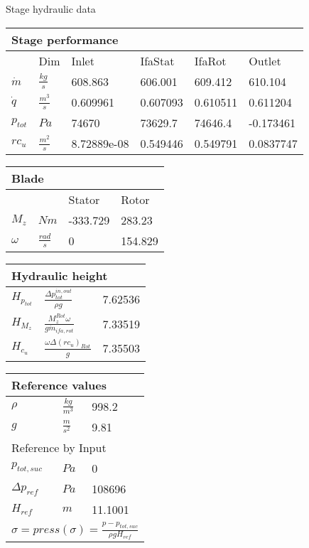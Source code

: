 {\huge Stage hydraulic data}
\vspace{20pt}\newline
\begin{tabular}{|l|l|l|l|l|l|}
\multicolumn{6}{l}{Stage performance} \\ 
\hline
& Dim & Inlet& IfaStat & IfaRot  & Outlet \\ 
\hline
$\dot m $ & $\frac{kg}{s}$ & 608.863 & 606.001 & 609.412 & 610.104 \\ 
\hline
$\dot q$ & $\frac{m^3}{s}$ & 0.609961 & 0.607093 & 0.610511 & 0.611204 \\ 
\hline
$p_{tot}$ & $Pa$ & 74670 & 73629.7 & 74646.4 & -0.173461 \\ 
\hline
$rc_u$ & $\frac{m^2}{s}$ & 8.72889e-08 & 0.549446 & 0.549791 & 0.0837747 \\ 
\hline
\end{tabular}
\vspace{20pt}\newline
\begin{tabular}{|l|l|l|l|}
\multicolumn{4}{l}{Blade} \\ 
\hline
& & Stator & Rotor\\ 
\hline
$M_z$ &$Nm$ & -333.729& 283.23\\ 
\hline
$\omega$ & $\frac{rad}{s}$ & 0& 154.829\\ 
\hline
\end{tabular}
\vspace{20pt}\newline
\begin{tabular}{|l|l|l|}
\multicolumn{3}{l}{Hydraulic height} \\ 
\hline
$H_{p_{tot}}$ &$\frac{\Delta p^{in,out}_{tot}}{\rho g}$ & 7.62536 \\ 
\hline
$H_{M_z}$ &$\frac{M_z^{Rot} \omega}{g \dot m_{ifa,rot}}$ & 7.33519 \\ 
\hline
$H_{c_u}$ &$\frac{\omega \Delta(r c_u)_{Rot} }{g}$ & 7.35503 \\ 
\hline
\end{tabular}
\vspace{20pt}\newline
\begin{tabular}{|l|l|l|}
\multicolumn{3}{l}{Reference values} \\ 
\hline
$\rho$ &$\frac{kg}{m^3}$ & 998.2 \\ 
\hline
$g$ &$\frac{m}{s^2}$ & 9.81 \\ 
\hline
\multicolumn{3}{|l|}{Reference by Input} \\ 
\hline
$p_{tot,suc}$ &$Pa$ & 0 \\ 
\hline
$\Delta p_{ref}$ &$Pa$ & 108696 \\ 
\hline
$H_{ref}$ &$m$ & 11.1001 \\ 
\hline
\multicolumn{3}{|l|}{$\sigma = press(\sigma) = \frac{p-p_{tot,suc}}{\rho g H_{ref}}$} \\ 
\hline
\end{tabular}

